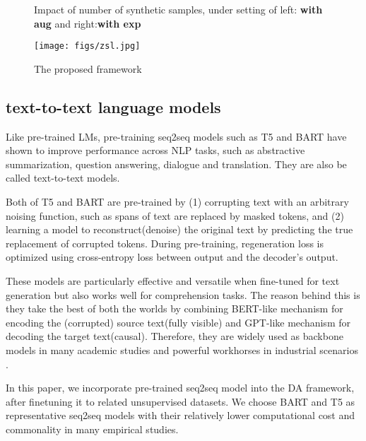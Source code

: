 \begin{figure}
        
        
    \caption{Impact of number of synthetic samples, under setting of left: \textbf{with aug} and right:\textbf{with exp}}
    \label{var_sample_augexp}
\end{figure}

\begin{figure}
    \centering
        \texttt{[image: figs/zsl.jpg]}
    \caption{The proposed framework}
    \label{whole_frame}
\end{figure}


\subsection{text-to-text language models}
Like pre-trained LMs, pre-training seq2seq models such as T5 \cite{raffel2019exploring} and BART \cite{lewis2020bart} have shown to improve performance across NLP tasks, such as abstractive summarization, question answering, dialogue and translation. They are also be called text-to-text models. 

Both of T5 and BART are pre-trained by (1) corrupting text with an arbitrary noising function, such as spans of text are replaced by masked tokens, and (2) learning a model to reconstruct(denoise) the original text by predicting the true replacement of corrupted tokens. During pre-training, regeneration loss is optimized using cross-entropy loss between output and the decoder’s output.

These models are particularly effective and versatile when fine-tuned for text generation but also works well for comprehension tasks. The reason behind this is they take the best of both the worlds by combining BERT-like mechanism for encoding the (corrupted) source text(fully visible) and GPT-like mechanism for decoding the target text(causal).
Therefore, they are widely used as backbone models in many academic studies and powerful workhorses in industrial scenarios \cite{liu2020multilingual}. 

In this paper, we incorporate pre-trained seq2seq model into the DA framework, after finetuning it to related unsupervised datasets. We choose BART and T5 as representative seq2seq models with their relatively lower computational cost and commonality in many empirical studies.